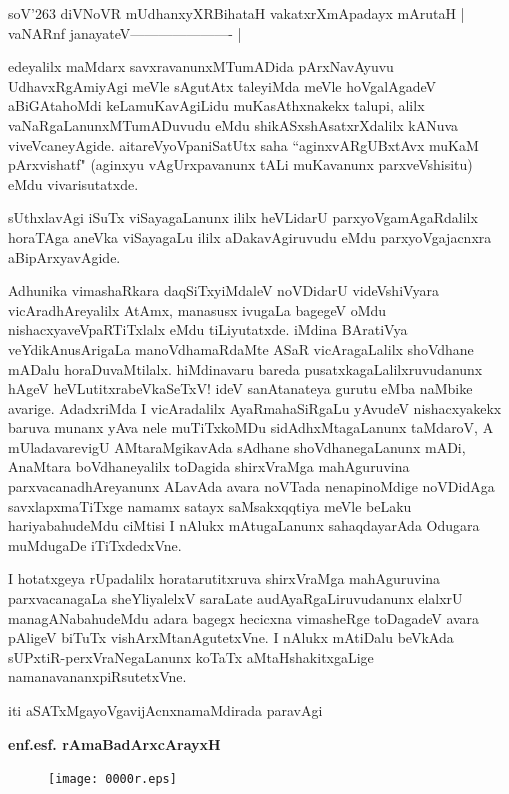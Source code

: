 \begin{shloka}
soV\char'263 diVNoVR mUdhanxyXRBihataH vakatxrXmApadayx mArutaH |\\
vaNARnf janayateV---------------------- |\\
\end{shloka}

edeyalilx maMdarx savxravanunxMTumADida pArxNavAyuvu UdhavxRgAmiyAgi meVle sAgutAtx taleyiMda meVle hoVgalAgadeV aBiGAtahoMdi keLamuKavAgiLidu muKasAthxnakekx talupi, alilx vaNaRgaLanunxMTumADuvudu eMdu shikASxshAsatxrXdalilx kANuva viveVcaneyAgide. aitareVyoVpaniSatUtx saha ``aginxvARgUBxtAvx muKaM pArxvishatf" (aginxyu vAgUrxpavanunx tALi muKavanunx parxveVshisitu) eMdu vivarisutatxde.

sUthxlavAgi iSuTx viSayagaLanunx ililx heVLidarU parxyoVgamAgaRdalilx horaTAga aneVka viSayagaLu ililx aDakavAgiruvudu eMdu parxyoVgajacnxra aBipArxyavAgide.

Adhunika vimashaRkara daqSiTxyiMdaleV noVDidarU videVshiVyara vicAradhAreyalilx AtAmx, manasusx ivugaLa bagegeV oMdu nishacxyaveVpaRTiTxlalx eMdu tiLiyutatxde. iMdina BAratiVya veYdikAnusArigaLa manoVdhamaRdaMte ASaR vicAragaLalilx shoVdhane mADalu horaDuvaMtilalx. hiMdinavaru bareda pusatxkagaLalilxruvudanunx hAgeV heVLutitxrabeVkaSeTxV! ideV sanAtanateya gurutu eMba naMbike avarige. AdadxriMda I vicAradalilx AyaRmahaSiRgaLu yAvudeV nishacxyakekx baruva munanx yAva nele muTiTxkoMDu sidAdhxMtagaLanunx taMdaroV, A mUladavarevigU AMtaraMgikavAda sAdhane shoVdhanegaLanunx mADi, AnaMtara boVdhaneyalilx toDagida shirxVraMga mahAguruvina parxvacanadhAreyanunx ALavAda avara noVTada nenapinoMdige noVDidAga savxlapxmaTiTxge namamx satayx saMsakxqqtiya meVle beLaku hariyabahudeMdu ciMtisi I nAlukx mAtugaLanunx sahaqdayarAda Odugara muMdugaDe iTiTxdedxVne. 

I hotatxgeya rUpadalilx horatarutitxruva shirxVraMga mahAguruvina parxvacanagaLa sheYliyalelxV saraLate audAyaRgaLiruvudanunx elalxrU managANabahudeMdu adara bagegx hecicxna vimasheRge toDagadeV avara pAligeV biTuTx vishArxMtanAgutetxVne. I nAlukx mAtiDalu beVkAda sUPxtiR-perxVraNegaLanunx koTaTx aMtaHshakitxgaLige namanavananxpiRsutetxVne.

\bigskip

\hfill iti aSATxMgayoVgavijAcnxnamaMdirada paravAgi

\smallskip

\hfill {\bf enf.esf. rAmaBadArxcArayxH}

\newpage

\thispagestyle{empty}
\begin{figure}[h]
\centering
{\texttt{[image: 0000r.eps]}}
\end{figure}
